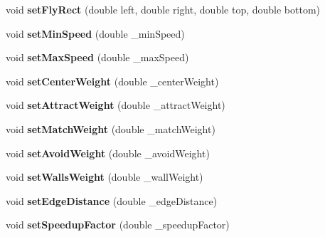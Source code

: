\begin{DoxyCompactItemize}
\item 
\hypertarget{class_boids_manager_aad30bca3303baa5d7767b980541b0f90}{void {\bfseries set\-Fly\-Rect} (double left, double right, double top, double bottom)}\label{class_boids_manager_aad30bca3303baa5d7767b980541b0f90}

\item 
\hypertarget{class_boids_manager_ad39fbc33bb34d9e27918fd80d6a8e7ee}{void {\bfseries set\-Min\-Speed} (double \-\_\-min\-Speed)}\label{class_boids_manager_ad39fbc33bb34d9e27918fd80d6a8e7ee}

\item 
\hypertarget{class_boids_manager_a1c7bf8506ef20b5e20f3864cb992b9ff}{void {\bfseries set\-Max\-Speed} (double \-\_\-max\-Speed)}\label{class_boids_manager_a1c7bf8506ef20b5e20f3864cb992b9ff}

\item 
\hypertarget{class_boids_manager_aaadaeec73f06870cc2f37dfb90a0075d}{void {\bfseries set\-Center\-Weight} (double \-\_\-center\-Weight)}\label{class_boids_manager_aaadaeec73f06870cc2f37dfb90a0075d}

\item 
\hypertarget{class_boids_manager_ada861cd0965c2161abe55c053446cd47}{void {\bfseries set\-Attract\-Weight} (double \-\_\-attract\-Weight)}\label{class_boids_manager_ada861cd0965c2161abe55c053446cd47}

\item 
\hypertarget{class_boids_manager_ae13ecac01d17e0000f6a19f9df8b5f19}{void {\bfseries set\-Match\-Weight} (double \-\_\-match\-Weight)}\label{class_boids_manager_ae13ecac01d17e0000f6a19f9df8b5f19}

\item 
\hypertarget{class_boids_manager_affc5b912ba797f21a02791c149eefc9f}{void {\bfseries set\-Avoid\-Weight} (double \-\_\-avoid\-Weight)}\label{class_boids_manager_affc5b912ba797f21a02791c149eefc9f}

\item 
\hypertarget{class_boids_manager_a84e8588c0955173f09beb56bef894bea}{void {\bfseries set\-Walls\-Weight} (double \-\_\-wall\-Weight)}\label{class_boids_manager_a84e8588c0955173f09beb56bef894bea}

\item 
\hypertarget{class_boids_manager_aa0f58b340ecbccf8c5b3becca9c59b5c}{void {\bfseries set\-Edge\-Distance} (double \-\_\-edge\-Distance)}\label{class_boids_manager_aa0f58b340ecbccf8c5b3becca9c59b5c}

\item 
\hypertarget{class_boids_manager_aba1e3cb3003741fc00c57273450b786e}{void {\bfseries set\-Speedup\-Factor} (double \-\_\-speedup\-Factor)}\label{class_boids_manager_aba1e3cb3003741fc00c57273450b786e}


\end{DoxyCompactItemize}
